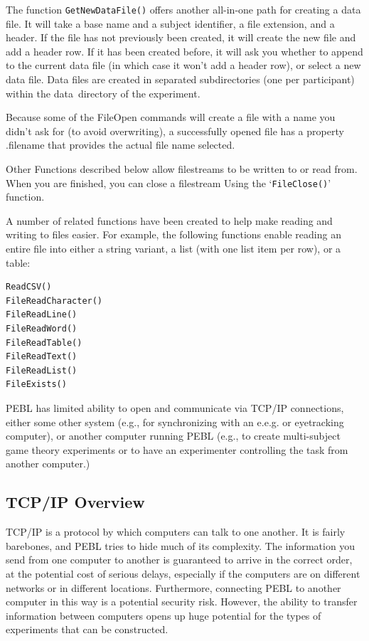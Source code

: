 The function \texttt{GetNewDataFile()} offers another all-in-one path for creating a data file.  It will take a base name and a subject identifier, a file extension, and a header.  If the file has not previously been created, it will create the new file and add a header row.  If it has been created before, it will ask you whether to append to the current data file (in which case it won't add a header row), or select a new data file.  Data files are created in separated subdirectories (one per participant) within the data\ directory of the experiment.


Because some of the FileOpen commands will create a file with a name you didn't ask for (to avoid overwriting), a successfully opened file has a property .filename that provides the actual file name selected.



Other Functions described below allow filestreams to be written to 
or read from.  When you are finished, you can close a filestream 
Using the `\texttt{FileClose()}' function.


A number of related functions have been created to help make reading and writing to files easier. For example, the following functions enable reading an entire file into either a string variant, a list (with one list item per row), or a table:
\begin{verbatim}
ReadCSV()
FileReadCharacter()
FileReadLine()
FileReadWord()
FileReadTable()
FileReadText()
FileReadList()
FileExists()
\end{verbatim}






PEBL has limited ability to open and communicate via  TCP/IP
connections, either some other system (e.g., for synchronizing with an
e.e.g. or eyetracking computer), or another computer running PEBL
(e.g., to create multi-subject game theory experiments or to have an
experimenter controlling the task from another computer.)

\subsection{TCP/IP Overview}
TCP/IP is a protocol by which computers can talk to one another.  It
is fairly barebones, and PEBL tries to hide much of its
complexity. The information you send from one computer to another is
guaranteed to arrive in the correct order, at the potential cost of
serious delays, especially if the computers are on different networks
or in different locations.  Furthermore, connecting PEBL to another
computer in this way is a potential security risk. However, the
ability to transfer information between computers opens up huge
potential for the types of experiments that can be constructed.

